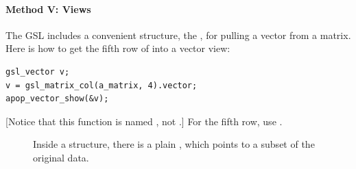 \paragraph{Method V: Views}
The GSL includes a convenient structure, the , for pulling a vector from a
matrix. Here is how to get the fifth row of  into a vector view:

\begin{lstlisting}
gsl_vector v;
v = gsl_matrix_col(a_matrix, 4).vector;
apop_vector_show(&v);
\end{lstlisting}
[Notice that this function is named , not .]
For the fifth row, use . 

\begin{figure}[htb]
\begin{center}
\end{center}
\caption{Inside a  structure, there is a plain
, which points to a subset of the original data.}
\label{viewfig}
\end{figure}
